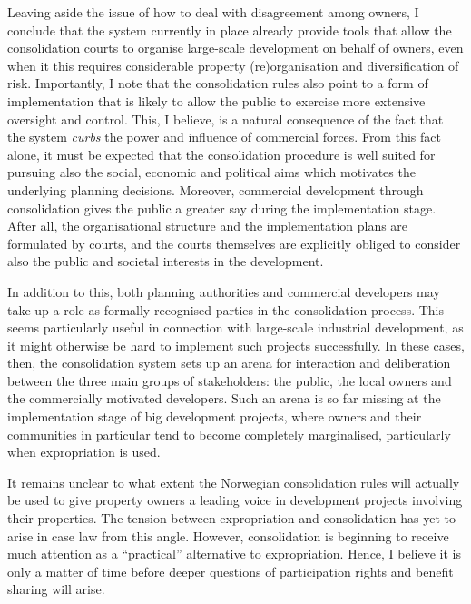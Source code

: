 
Leaving aside the issue of how to deal with disagreement among owners, I conclude that the system currently in place already provide tools that allow the consolidation courts to organise large-scale development on behalf of owners, even when it this requires considerable property (re)organisation and diversification of risk. Importantly, I note that the consolidation rules also point to a form of implementation that is likely to allow the public to exercise more extensive oversight and control. This, I believe, is a natural consequence of the fact that the system \emph{curbs} the power and influence of commercial forces. From this fact alone, it must be expected that the consolidation procedure is well suited for pursuing also the social, economic and political aims which motivates the underlying planning decisions. Moreover, commercial development through consolidation gives the public a greater say during the implementation stage. After all, the organisational structure and the implementation plans are formulated by courts, and the courts themselves are explicitly obliged to consider also the public and societal interests in the development.

In addition to this, both planning authorities and commercial developers may take up a role as formally recognised parties in the consolidation process. This seems particularly useful in connection with large-scale industrial development, as it might otherwise be hard to implement such projects successfully. In these cases, then, the consolidation system sets up an arena for interaction and deliberation between the three main groups of stakeholders: the public, the local owners and the commercially motivated developers. Such an arena is so far missing at the implementation stage of big development projects, where owners and their communities in particular tend to become completely marginalised, particularly when expropriation is used.

It remains unclear to what extent the Norwegian consolidation rules will actually be used to give property owners a leading voice in development projects involving their properties. The tension between expropriation and consolidation has yet to arise in case law from this angle. However, consolidation is beginning to receive much attention as a ``practical'' alternative to expropriation. Hence, I believe it is only a matter of time before deeper questions of participation rights and benefit sharing will arise.


